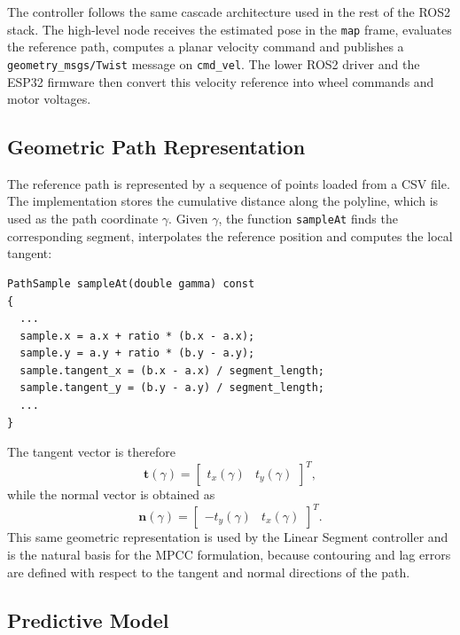 The controller follows the same cascade architecture used in the rest of the
ROS2 stack.  The high-level node receives the estimated pose in the
\texttt{map} frame, evaluates the reference path, computes a planar velocity
command and publishes a \texttt{geometry\_msgs/Twist} message on
\texttt{cmd\_vel}.  The lower ROS2 driver and the ESP32 firmware then convert
this velocity reference into wheel commands and motor voltages.

\subsection{Geometric Path Representation}

The reference path is represented by a sequence of points loaded from a CSV file.
The implementation stores the cumulative distance along the polyline, which is
used as the path coordinate \(\gamma\).  Given \(\gamma\), the function
\texttt{sampleAt} finds the corresponding segment, interpolates the reference
position and computes the local tangent:

\begin{verbatim}
PathSample sampleAt(double gamma) const
{
  ...
  sample.x = a.x + ratio * (b.x - a.x);
  sample.y = a.y + ratio * (b.y - a.y);
  sample.tangent_x = (b.x - a.x) / segment_length;
  sample.tangent_y = (b.y - a.y) / segment_length;
  ...
}
\end{verbatim}

The tangent vector is therefore
\begin{equation}
    \mathbf{t}(\gamma)=
    \begin{bmatrix}
        t_x(\gamma) & t_y(\gamma)
    \end{bmatrix}^{T},
\end{equation}
while the normal vector is obtained as
\begin{equation}
    \mathbf{n}(\gamma)=
    \begin{bmatrix}
        -t_y(\gamma) & t_x(\gamma)
    \end{bmatrix}^{T}.
\end{equation}
This same geometric representation is used by the Linear Segment controller and
is the natural basis for the MPCC formulation, because contouring and lag errors
are defined with respect to the tangent and normal directions of the path.

\subsection{Predictive Model}

